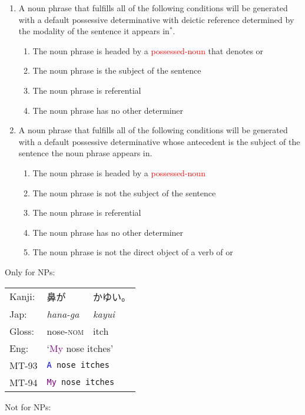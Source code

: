 \documentclass[a4paper,landscape,headrule,footrule,xetex]{foils}
\newcommand{\psp}[1]{\textcolor{purple}{#1}}
\newcommand{\dtr}[1]{\textcolor{blue}{#1}}
\newcommand{\trg}[1]{\textcolor{red}{#1}}
\begin{document}
  \myslide{Translating NPs headed by \trg{possessed-nouns}}
     \begin{enumerate} %
     \item A noun phrase that fulfills all of the following conditions
       will be generated with a default possessive determinative with
       deictic reference determined by the modality of the sentence it
       appears in$^*$.
        \begin{enumerate}
        \item The noun phrase is headed by a \trg{possessed-noun} that
          denotes  or 
        \item The noun phrase is the subject of the sentence
        \item The noun phrase is referential
        \item The noun phrase has no other determiner
        \end{enumerate}
\newpage
\MyLogo{}
      \item A noun phrase that fulfills all of the following
        conditions will be generated with a default possessive
        determinative whose antecedent is the subject of the sentence
        the noun phrase appears in.
        \begin{enumerate}
        \item The noun phrase is headed by a \trg{possessed-noun} 
        \item The noun phrase is not the subject of the sentence
        \item The noun phrase is referential
        \item The noun phrase has no other determiner
        \item The noun phrase is not the direct object of a verb of
           or 
        \end{enumerate}
      \end{enumerate}



\noindent Only for  NPs:

\begin{exe}
  \ex
\begin{tabular}[t]{lll}
Kanji: &  鼻が &  かゆい。\\
Jap:   &  \sl hana-ga & \sl kayui \\
Gloss: &   nose-\textsc{nom} &  itch \\
Eng:   & \multicolumn{2}{l}{`\psp{My} nose itches'} \\
MT-93 & \multicolumn{2}{l}{\tt \dtr{A} nose itches} \\
MT-94 & \multicolumn{2}{l}{\tt \psp{My} nose itches} 
\end{tabular}
\end{exe}
\newpage
\noindent Not for  NPs:
\end{document}

